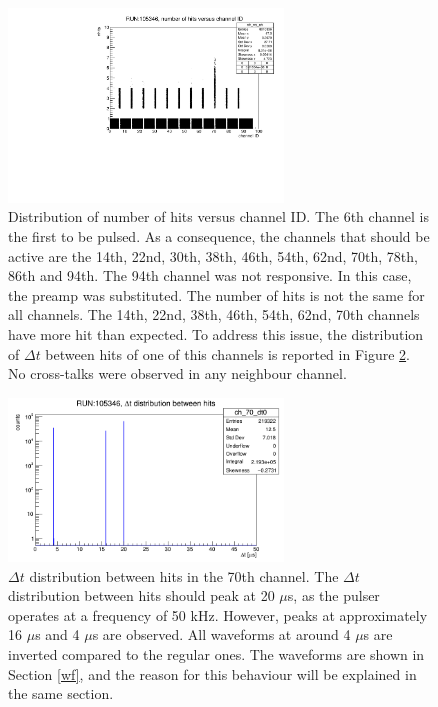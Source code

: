 \begin{figure}[!h]
  \centering
  \includegraphics[width=0.65\textwidth]{figures/pdf/run105346_nh_vs_ch.pdf}
  \caption[The occupancy plot (dead channel and more hits than expected).]{Distribution of number of hits versus channel ID. 
  The 6th channel is the first to be pulsed.
  As a consequence, the channels that should be active are the 
  14th, 22nd, 30th, 38th, 46th, 54th, 62nd, 70th, 78th, 86th and 94th. 
  The 94th channel was not responsive. In this case, the preamp 
  was substituted. The number of hits is not the same 
  for all channels. The 14th, 22nd, 38th, 46th, 54th, 62nd, 
  70th channels have more hit than expected.
  To address this issue, the distribution of $\Delta t$ between 
  hits of one of this channels is reported in Figure \ref{fig:deltatnhits}.
  No cross-talks were observed in any neighbour channel.}
 \label{fig:dead}
\end{figure}


\begin{figure}[!h]
  \centering
  \includegraphics[width=0.65\textwidth]{figures/png/deltathits.png}
  \caption[$\Delta t$ distribution between hits in the 70th channel.]{$\Delta t$ distribution between hits in the 70th channel. The $\Delta t$ distribution between hits 
  should peak at 20 $\mu$s, as the pulser operates at a frequency of 50 kHz. However, peaks at approximately 
  16 $\mu$s and 4 $\mu$s are observed. All waveforms at around 4 $\mu$s are inverted compared to the regular ones. 
  The waveforms are shown in Section \ref{wf}, and the reason for this behaviour will be explained in the same section.}
 \label{fig:deltatnhits}
\end{figure}

